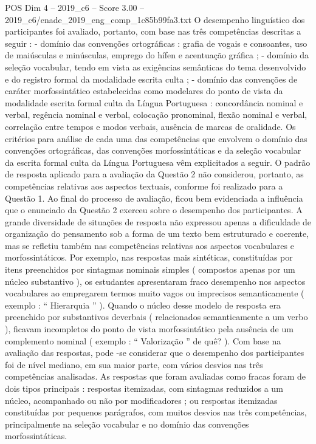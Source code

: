 \begin{textsample}{POS Dim 4 – 2019\_c6 – Score 3.00 – 2019\_c6/enade\_2019\_eng\_comp\_1c85b99fa3.txt}
O desempenho linguístico dos participantes foi avaliado, portanto, com base nas três competências descritas a seguir : - domínio das convenções ortográficas : grafia de vogais e consoantes, uso de maiúsculas e minúsculas, emprego do hífen e acentuação gráfica ; - domínio da seleção vocabular, tendo em vista as exigências semânticas do tema desenvolvido e do registro formal da modalidade escrita culta ; - domínio das convenções de caráter morfossintático estabelecidas como modelares do ponto de vista da modalidade escrita formal culta da Língua Portuguesa : concordância nominal e verbal, regência nominal e verbal, colocação pronominal, flexão nominal e verbal, correlação entre tempos e modos verbais, ausência de marcas de oralidade.
Os critérios para análise de cada uma das competências que envolvem o domínio das convenções ortográficas, das convenções morfossintáticas e da seleção vocabular da escrita formal culta da Língua Portuguesa vêm explicitados a seguir.
O padrão de resposta aplicado para a avaliação da Questão 2 não considerou, portanto, as competências relativas aos aspectos textuais, conforme foi realizado para a Questão 1.
Ao final do processo de avaliação, ficou bem evidenciada a influência que o enunciado da Questão 2 exerceu sobre o desempenho dos participantes.
A grande diversidade de situações de resposta não expressou apenas a dificuldade de organização do pensamento sob a forma de um texto bem estruturado e coerente, mas se refletiu também nas competências relativas aos aspectos vocabulares e morfossintáticos.
Por exemplo, nas respostas mais sintéticas, constituídas por itens preenchidos por sintagmas nominais simples ( compostos apenas por um núcleo substantivo ), os estudantes apresentaram fraco desempenho nos aspectos vocabulares ao empregarem termos muito vagos ou imprecisos semanticamente ( exemplo : “ Hierarquia ” ).
Quando o núcleo desse modelo de resposta era preenchido por substantivos deverbais ( relacionados semanticamente a um verbo ), ficavam incompletos do ponto de vista morfossintático pela ausência de um complemento nominal ( exemplo : “ Valorização ” de quê? ).
Com base na avaliação das respostas, pode -se considerar que o desempenho dos participantes foi de nível mediano, em sua maior parte, com vários desvios nas três competências analisadas.
As respostas que foram avaliadas como fracas foram de dois tipos principais : respostas itemizadas, com sintagmas reduzidos a um núcleo, acompanhado ou não por modificadores ; ou respostas itemizadas constituídas por pequenos parágrafos, com muitos desvios nas três competências, principalmente na seleção vocabular e no domínio das convenções morfossintáticas.

\end{textsample}
